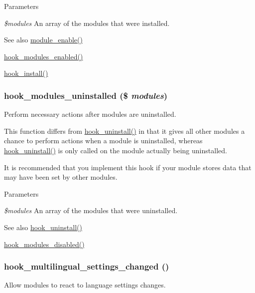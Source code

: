\begin{DoxyParams}{Parameters}
\item[{\em \$modules}]An array of the modules that were installed.\end{DoxyParams}
\begin{DoxySeeAlso}{See also}
\hyperlink{module_8inc_a4b2c9ea60d7c88595eaebfc4abd5f1bf}{module\_\-enable()} 

\hyperlink{group__hooks_ga0eb7c67333e0f40b4a46c0dc4c4a92f3}{hook\_\-modules\_\-enabled()} 

\hyperlink{group__hooks_ga1ecdb5a2a046ea63dc790c3ed90338e5}{hook\_\-install()} 
\end{DoxySeeAlso}
\hypertarget{group__hooks_ga4f29c7343438068a922459cbe0810279}{
\subsubsection[{hook\_\-modules\_\-uninstalled}]{\setlength{\rightskip}{0pt plus 5cm}hook\_\-modules\_\-uninstalled (\$ {\em modules})}}
\label{group__hooks_ga4f29c7343438068a922459cbe0810279}
Perform necessary actions after modules are uninstalled.

This function differs from \hyperlink{group__hooks_ga3fb24f6923b3e585d6326ff5abdcc57c}{hook\_\-uninstall()} in that it gives all other modules a chance to perform actions when a module is uninstalled, whereas \hyperlink{group__hooks_ga3fb24f6923b3e585d6326ff5abdcc57c}{hook\_\-uninstall()} is only called on the module actually being uninstalled.

It is recommended that you implement this hook if your module stores data that may have been set by other modules.


\begin{DoxyParams}{Parameters}
\item[{\em \$modules}]An array of the modules that were uninstalled.\end{DoxyParams}
\begin{DoxySeeAlso}{See also}
\hyperlink{group__hooks_ga3fb24f6923b3e585d6326ff5abdcc57c}{hook\_\-uninstall()} 

\hyperlink{group__hooks_ga591c577fba8ca8dc8ec17f8bf80bdc4c}{hook\_\-modules\_\-disabled()} 
\end{DoxySeeAlso}
\hypertarget{group__hooks_ga87a996b741bb1787b2451a2b842e20e8}{
\subsubsection[{hook\_\-multilingual\_\-settings\_\-changed}]{\setlength{\rightskip}{0pt plus 5cm}hook\_\-multilingual\_\-settings\_\-changed ()}}
\label{group__hooks_ga87a996b741bb1787b2451a2b842e20e8}
Allow modules to react to language settings changes.


